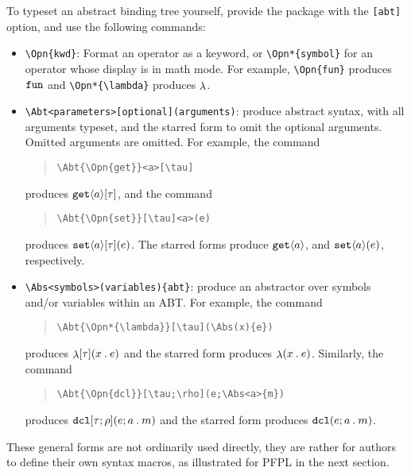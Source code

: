 \documentclass[11pt]{article}
\begin{document}
To typeset an abstract binding tree yourself, provide the package with the \verb|[abt]| option, and use the following commands:
\begin{itemize}
  \item \verb|\Opn{kwd}|: Format an operator as a keyword, or \verb|\Opn*{symbol}| for an operator whose display is in math mode.  For example, \verb|\Opn{fun}| produces $\Opn{fun}$ and \verb|\Opn*{\lambda}| produces $\Opn*{\lambda}$.

  \item \verb|\Abt<parameters>[optional](arguments)|: produce abstract syntax, with all arguments typeset, and the starred form to omit the optional arguments.  Omitted arguments are omitted.  For example, the command
  \begin{quote}
\begin{verbatim}
\Abt{\Opn{get}}<a>[\tau]
\end{verbatim}
\end{quote}
 produces $\Abt{\Opn{get}}<a>[\tau]$, and the command
  \begin{quote}
\begin{verbatim}
\Abt{\Opn{set}}[\tau]<a>(e)
\end{verbatim}
  \end{quote}
  produces $\Abt{\Opn{set}}<a>[\tau](e)$.  The starred forms produce $\Abt*{\Opn{get}}<a>[\tau]$, and $\Abt*{\Opn{set}}<a>[\tau](e)$, respectively.

  \item \verb|\Abs<symbols>(variables){abt}|: produce an abstractor over symbols and/or variables within an ABT.  For example, the command
  \begin{quote}
\begin{verbatim}
\Abt{\Opn*{\lambda}}[\tau](\Abs(x){e})
\end{verbatim}
  \end{quote}
  produces $\Abt{\Opn*{\lambda}}[\tau](\Abs(x){e})$ and the starred form produces $\Abt*{\Opn*{\lambda}}[\tau](\Abs(x){e})$.  Similarly, the command
  \begin{quote}
\begin{verbatim}
\Abt{\Opn{dcl}}[\tau;\rho](e;\Abs<a>{m})
\end{verbatim}
  \end{quote}
  produces $\Abt{\Opn{dcl}}[\tau;\rho](e;\Abs<a>{m})$ and the starred form produces $\Abt*{\Opn{dcl}}[\tau\,\rho](e;\Abs<a>{m})$.
\end{itemize}

These general forms are not ordinarily used directly, they are rather for authors to define their own syntax macros, as illustrated for \textsf{PFPL} in the next section.
\end{document}
